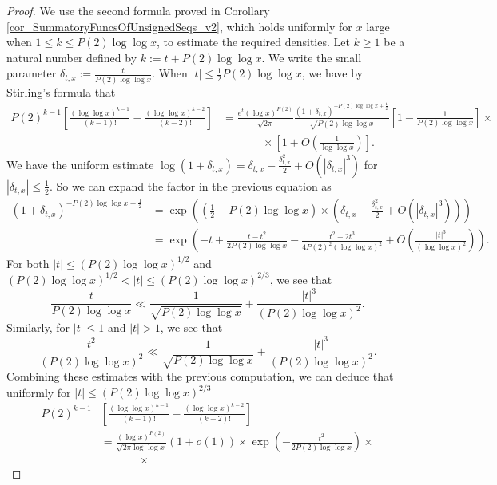 \documentclass[11pt,reqno,a4letter]{article}
\numberwithin{figure}{section}
\numberwithin{table}{section}
\theoremstyle{plain}
\numberwithin{theorem}{section}
\theoremstyle{definition}
\begin{document}
\begin{proof}
We use the second formula proved in Corollary \ref{cor_SummatoryFuncsOfUnsignedSeqs_v2}, 
which holds uniformly for $x$ large when $1 \leq k \leq P(2) \log\log x$, to estimate the 
required densities. 
Let $k \geq 1$ be a natural number defined by $k := t + P(2) \log\log x$. 
We write the small parameter $\delta_{t,x} := \frac{t}{P(2) \log\log x}$. 
When 
$|t| \leq \frac{1}{2} P(2) \log\log x$, we have by Stirling's formula that 
\begin{align*} 
P(2)^{k-1} \left[\frac{(\log\log x)^{k-1}}{(k-1)!} - \frac{(\log\log x)^{k-2}}{(k-2)!}\right] & = 
\frac{e^{t} (\log x)^{P(2)}}{\sqrt{2\pi}} \frac{(1+\delta_{t,x})^{-P(2)\log\log x + \frac{1}{2}}}{ 
     \sqrt{P(2) \log\log x}} \left[ 
     1 - \frac{1}{P(2) \log\log x}\right] \times \\ 
     & \phantom{=\qquad\ } \times 
     \left[ 
     1 + O\left(\frac{1}{\log\log x}\right)\right]. 
\end{align*} 
We have the uniform estimate 
$\log(1+\delta_{t,x}) = \delta_{t,x} - \frac{\delta_{t,x}^2}{2} + O(|\delta_{t,x}|^3)$ 
for $|\delta_{t,x}| \leq \frac{1}{2}$. So we can expand the factor in the previous 
equation as 
\begin{align*} 
(1+\delta_{t,x})^{-P(2)\log\log x + \frac{1}{2}} & = \exp\left(\left(\frac{1}{2}-P(2)\log\log x\right) \times 
     \left(\delta_{t,x} - \frac{\delta_{t,x}^2}{2} + O(|\delta_{t,x}|^3)\right)\right) \\ 
     & = \exp\left(-t + \frac{t-t^2}{2P(2)\log\log x} - \frac{t^2-2t^3}{4P(2)^2(\log\log x)^2} + 
     O\left(\frac{|t|^3}{(\log\log x)^2}\right)\right). 
\end{align*} 
For both $|t| \leq (P(2) \log\log x)^{1/2}$ and $(P(2) \log\log x)^{1/2} < |t| \leq (P(2) \log\log x)^{2/3}$, 
we see that 
\[
\frac{t}{P(2) \log\log x} \ll \frac{1}{\sqrt{P(2) \log\log x}} + \frac{|t|^3}{(P(2) \log\log x)^2}. 
\]
Similarly, for $|t| \leq 1$ and $|t| > 1$, we see that 
\[
\frac{t^2}{(P(2) \log\log x)^2} \ll \frac{1}{\sqrt{P(2) \log\log x}} + \frac{|t|^3}{(P(2) \log\log x)^2}. 
\]
Combining these estimates with the previous computation, we can deduce that 
uniformly for $|t| \leq (P(2) \log\log x)^{2/3}$ 
\begin{align*} 
P(2)^{k-1} & \left[\frac{(\log\log x)^{k-1}}{(k-1)!} - \frac{(\log\log x)^{k-2}}{(k-2)!}\right] \\ 
     & = \frac{(\log x)^{P(2)}}{\sqrt{2\pi \log\log x}} (1 + o(1)) \times 
     \exp\left(-\frac{t^2}{2P(2)\log\log x}\right) \times \\ 
     & \phantom{=\qquad} \times 

\end{align*}
\end{proof}
\end{document}
